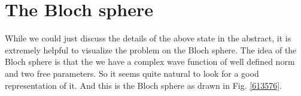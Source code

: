 \section{The Bloch sphere}

While we could just discuss the details of the above state in the abstract, it is extremely helpful to visualize the problem on the Bloch sphere. The idea of the Bloch sphere is that the we have a complex wave function of well defined norm and two free parameters. So it seems quite natural to look for a good representation of it. And this is the Bloch sphere as drawn in Fig. \ref{613576}. 